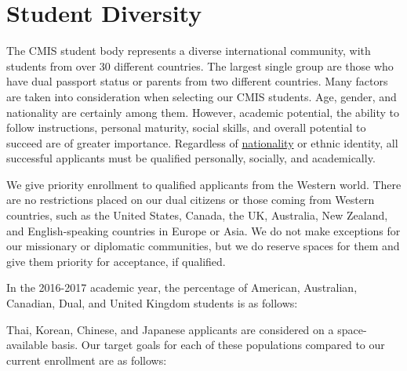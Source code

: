 \section{Student Diversity}


The CMIS student body represents a diverse international community, with students from over 30 different countries.  The largest single group are those who have dual passport status or parents from two different countries.  Many factors are taken into consideration when selecting our CMIS students.  Age, gender, and nationality are certainly among them.  However, academic potential, the ability to follow instructions, personal maturity, social skills, and overall potential to succeed are of greater importance.  Regardless of \href{https://docs.google.com/spreadsheets/d/15wjkZ9Yy__KpVuhKlawJuoMAAlCE6FMBsOJMKjXacYA/edit?ts=579eee90#gid=0}{nationality} or ethnic identity, all successful applicants must be qualified personally, socially, and academically.  

We give priority enrollment to qualified applicants from the Western world.  There are no restrictions placed on our dual citizens or those coming from Western countries, such as the United States, Canada, the UK, Australia, New Zealand, and English-speaking countries in Europe or Asia.  We do not make exceptions for our missionary or diplomatic communities, but we do reserve spaces for them and give them priority for acceptance, if qualified.  

In the 2016-2017 academic year, the percentage of American, Australian, Canadian, Dual, and United Kingdom students is as follows:


Thai, Korean, Chinese, and Japanese applicants are considered on a space-available basis.  Our target goals for each of these populations compared to our current enrollment are as follows:


